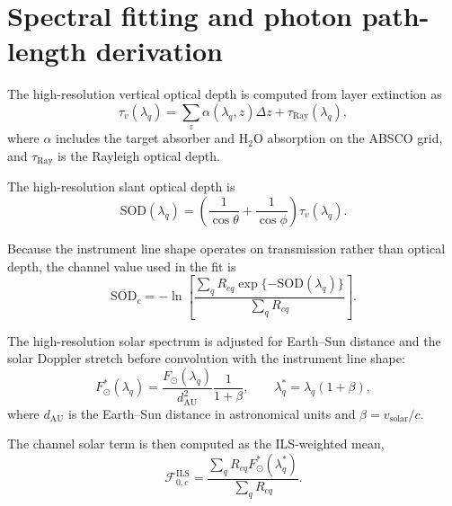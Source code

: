 \section{Spectral fitting and photon path-length derivation}
\label{app:spectral_fit_derivation}



The high-resolution vertical optical depth is computed from layer extinction as
\begin{equation}
\tau_v(\lambda_q)
=
\sum_z
\alpha(\lambda_q,z)\Delta z
+
\tau_{\mathrm{Ray}}(\lambda_q),
\label{eq:vertical_tau_hr}
\end{equation}
where $\alpha$ includes the target absorber and H$_2$O absorption on the ABSCO
grid, and $\tau_{\mathrm{Ray}}$ is the Rayleigh optical depth.


The high-resolution slant optical depth is
\begin{equation}
\mathrm{SOD}(\lambda_q)
=
\left(
\frac{1}{\cos\theta} + \frac{1}{\cos\phi}
\right)
\tau_v(\lambda_q).
\label{eq:hr_sod}
\end{equation}


Because the instrument line shape operates on transmission rather than optical
depth, the channel value used in the fit is
\begin{equation}
\overline{\mathrm{SOD}}_c
=
-\ln
\left[
\frac{
\sum_q R_{cq}\exp\{-\mathrm{SOD}(\lambda_q)\}
}{
\sum_q R_{cq}
}
\right].
\label{eq:discrete_ils_sod}
\end{equation}


The high-resolution solar spectrum is adjusted for Earth--Sun distance and the
solar Doppler stretch before convolution with the instrument line shape:
\begin{equation}
F_{\odot}^{\ast}(\lambda_q)
=
\frac{
F_{\odot}(\lambda_q)
}{
d_{\mathrm{AU}}^2
}
\frac{1}{1+\beta},
\qquad
\lambda_q^{\ast}
=
\lambda_q(1+\beta),
\label{eq:solar_distance_doppler}
\end{equation}
where $d_{\mathrm{AU}}$ is the Earth--Sun distance in astronomical units and
$\beta=v_{\mathrm{solar}}/c$.


The channel solar term is then computed as the ILS-weighted mean,
\begin{equation}
\mathcal{F}_{0,c}^{\mathrm{ILS}}
=
\frac{
\sum_q R_{cq}F_{\odot}^{\ast}(\lambda_q^{\ast})
}{
\sum_q R_{cq}
}.
\label{eq:solar_ils_convolution}
\end{equation}


